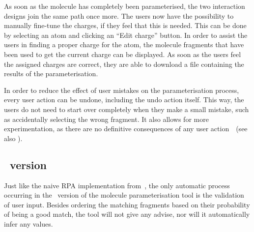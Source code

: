 As soon as the molecule has completely been parameterised, the two interaction designs join the same path once more. The users now have the possibility to manually fine-tune the charges, if they feel that this is needed. This can be done by selecting an atom and clicking an ``Edit charge'' button. In order to assist the users in finding a proper charge for the atom, the molecule fragments that have been used to get the current charge can be displayed. As soon as the users feel the assigned charges are correct, they are able to download a file containing the results of the parameterisation.

In order to reduce the effect of user mistakes on the parameterisation process, every user action can be undone, including the undo action itself. This way, the users do not need to start over completely when they make a small mistake, such as accidentally selecting the wrong fragment. It also allows for more experimentation, as there are no definitive consequences of any user action~\cite{norman2002design,norman2010gestural}~(see also ).


\subsection{\IDA\ version}
Just like the naive RPA implementation from~\cite{payne2000varying}, the only automatic process occurring in the \IDa\ version of the molecule parameterisation tool is the validation of user input. Besides ordering the matching fragments based on their probability of being a good match, the tool will not give any advise, nor will it automatically infer any values.

